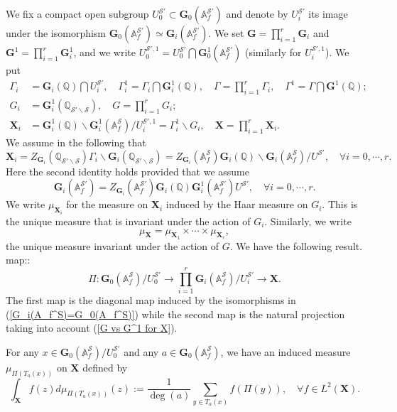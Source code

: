 \documentclass[11pt,oneside,reqno]{amsart}
\newcommand{\bfG}{\mathbf{G}}
\newcommand{\A}{\mathbb{A}}
\newcommand{\Q}{\mathbb{Q}}
\newcommand{\Scal}{\mathcal{S}}
\newcommand{\Gbf}{\mathbf{G}}
\newcommand{\Xbf}{\mathbf{X}}
\newcommand{\bcS}{\mathcal{S}}
\newcommand{\bfX}{\mathbf{X}}
\theoremstyle{plain}
\begin{document}
	
	
	
	
	
	We fix a compact open subgroup $U_0^{\bcS'}\subset\bfG_0(\mathbb{A}_f^{\bcS'})$ and denote by $U_i^{\bcS'}$ its image under the isomorphism $\bfG_0(\mathbb{A}_f^{\bcS'})\simeq\bfG_i(\mathbb{A}_f^{\bcS'})$. We set $\bfG=\prod_{i=1}^r\bfG_i$ and $\Gbf^1=\prod_{i=1}^r\Gbf_i^1$, and we write $U_0^{\Scal',1}=U_0^{\Scal'}\bigcap\Gbf_0^1(\A_f^{\Scal'})$ (similarly for $U_i^{\Scal',1}$). We put
	\begin{align*}
		\Gamma_i
		&=\bfG_i(\Q)\bigcap U_i^{\bcS'},
		\quad
		\Gamma_i^1=\Gamma_i\bigcap\Gbf_i^1(\Q),
		\quad
		\Gamma=\prod_{i=1}^r\Gamma_i,
		\quad
		\Gamma^1=\Gamma\bigcap\Gbf^1(\Q);
		\\
		G_i
		&=\bfG_i^1(\Q_{{\bcS'}\backslash\bcS}),
		\quad
		G=\prod_{i=1}^rG_i;
		\\
		\bfX_i
		&=
		\bfG_i^1(\Q)
		\backslash\bfG_i^1(\mathbb{A}_f^{\bcS})/U_i^{\bcS',1}
		=
		\Gamma_i^1
		\backslash
		G_i,
		\quad
		\bfX=\prod_{i=1}^r\bfX_i.
	\end{align*}
	We assume in the following that
	\begin{equation}\label{G vs G^1 for X}
		\Xbf_i
		=
		Z_{\Gbf_i}(\Q_{\Scal'\backslash\Scal})\Gamma_i
		\backslash
		\Gbf_i(\Q_{\Scal'\backslash\Scal})
		=
		Z_{\Gbf_i}(\A_f^\Scal)\Gbf_i(\Q)
		\backslash
		\Gbf_i(\A_f^\Scal)/U^{\Scal'},
		\quad
		\forall
		i=0,\cdots,r.
	\end{equation}
	Here the second identity holds provided that we assume
	\[
	\Gbf_i(\A_f^{\Scal'})
	=
	Z_{\Gbf_i}(\A_f^{\Scal'})\Gbf_i(\Q)
	\Gbf_i^1(\A_f^{\Scal'})U^{\Scal'},
	\quad
	\forall
	i=0,\cdots,r.
	\]
	We write $\mu_{\bfX_i}$ for the measure on $\bfX_i$ induced by the Haar measure on $G_i$. This is the unique measure that is invariant under the action of $G_i$. Similarly, we write
	\[
	\mu_{\bfX}=\mu_{\bfX_1}\times\cdots\times\mu_{\bfX_r},
	\]
	the unique measure invariant under the action of $G$.
	We have the following result. map::
	\[
	\Pi
	\colon
	\bfG_0(\mathbb{A}_f^{\bcS})/U_0^{\bcS'}
	\to
	\prod_{i=1}^r
	\bfG_i(\mathbb{A}_f^{\bcS})/U_i^{\bcS'}
	\to
	\bfX.
	\]
	The first map is the diagonal map induced by the isomorphisms in (\ref{G_i(A_f^S)=G_0(A_f^S)}) while the second map is the natural projection taking into account (\ref{G vs G^1 for X}).
	
	
	For any $x\in\bfG_0(\mathbb{A}_f^{\bcS})/U_0^{\bcS'}$ and any $a\in\bfG_0(\mathbb{A}_f^{\bcS})$, we have an induced measure $\mu_{\Pi(T_a(x))}$ on $\bfX$ defined by
	\[
	\int_{\bfX}f(z)d\mu_{\Pi(T_a(x))}(z)
	:=
	\frac{1}{\deg(a)}
	\sum_{y\in T_a(x)}f(\Pi(y)),
	\quad
	\forall
	f\in L^2(\bfX).
	\]
	
\end{document}
